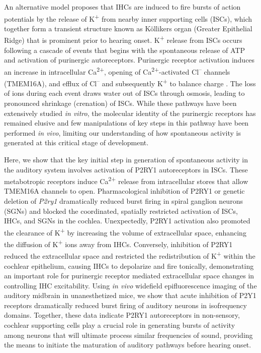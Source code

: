 \documentclass[9pt,lineno]{elife}
\begin{document}
An alternative model proposes that IHCs are induced to fire bursts of action potentials by the release of K\textsuperscript{+} from nearby inner supporting cells (ISCs), which together form a transient structure known as Köllikers organ (Greater Epithelial Ridge) that is prominent prior to hearing onset. K\textsuperscript{+} release from ISCs occurs following a cascade of events that begins with the spontaneous release of ATP and activation of purinergic autoreceptors. Purinergic receptor activation induces an increase in intracellular Ca\textsuperscript{2+}, opening of Ca\textsuperscript{2+}-activated Cl\textsuperscript{--} channels (TMEM16A), and efflux of Cl\textsuperscript{--} and subsequently K\textsuperscript{+} to balance charge \citep{Tritsch2007,Wang2015}. The loss of ions during each event draws water out of ISCs through osmosis, leading to pronounced shrinkage (crenation) of ISCs. While these pathways have been extensively studied \textit{in vitro}, the molecular identity of the purinergic receptors has remained elusive and few manipulations of key steps in this pathway have been performed \textit{in vivo}, limiting our understanding of how spontaneous activity is generated at this critical stage of development.

Here, we show that the key initial step in generation of spontaneous activity in the auditory system involves activation of P2RY1 autoreceptors in ISCs. These metabotropic receptors induce Ca\textsuperscript{2+} release from intracellular stores that allow TMEM16A channels to open. Pharmacological inhibition of P2RY1 or genetic deletion of \textit{P2ry1} dramatically reduced burst firing in spiral ganglion neurons (SGNs) and blocked the coordinated, spatially restricted activation of ISCs, IHCs, and SGNs in the cochlea. Unexpectedly, P2RY1 activation also promoted the clearance of K\textsuperscript{+} by increasing the volume of extracellular space, enhancing the diffusion of K\textsuperscript{+} ions away from IHCs. Conversely, inhibition of P2RY1 reduced the extracellular space and restricted the redistribution of K\textsuperscript{+} within the cochlear epithelium, causing IHCs to depolarize and fire tonically, demonstrating an important role for purinergic receptor mediated extracellular space changes in controlling IHC excitability. Using \textit{in vivo} widefield epifluorescence imaging of the auditory midbrain in unanesthetized mice, we show that acute inhibition of P2Y1 receptors dramatically reduced burst firing of auditory neurons in isofrequency domains. Together, these data indicate P2RY1 autoreceptors in non-sensory, cochlear supporting cells play a crucial role in generating bursts of activity among neurons that will ultimate process similar frequencies of sound, providing the means to initiate the maturation of auditory pathways before hearing onset.
\end{document}
